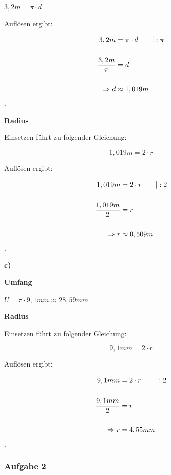 \documentclass[
  ngerman,
]{book}
\begin{document}
\(3,2m = \pi \cdot d \quad\)

Auflösen ergibt:

\[ \begin{align} 3,2m &= \pi \cdot d \quad\quad |: \pi \\
{}\\
{3,2m \over \pi} &= d \\
{}\\
\Rightarrow d & \approx 1,019 m
\end{align}\].

\textbf{Radius}

Einsetzen führt zu folgender Gleichung:

\[1,019 m =2 \cdot r\]

Auflösen ergibt:

\[ \begin{align} 1,019 m &=2 \cdot r \quad\quad |: 2 \\
{}\\
{1,019m \over 2} &= r \\
{}\\
\Rightarrow r & \approx 0,509 m
\end{align}\].

\textbf{c)}

\textbf{Umfang}

\(U = \pi \cdot 9,1mm \approx 28,59 mm\)

\textbf{Radius}

Einsetzen führt zu folgender Gleichung:

\[9,1 mm =2 \cdot r\]

Auflösen ergibt:

\[ \begin{align} 9,1 mm &=2 \cdot r \quad\quad |: 2 \\
{}\\
{9,1mm \over 2} &= r \\
{}\\
\Rightarrow r & = 4,55mm
\end{align}\].

\hypertarget{section-28}{%
\subsubsection*{}\label{section-28}}

\hypertarget{aufgabe-2-5}{%
\subsubsection*{Aufgabe 2}\label{aufgabe-2-5}}
\end{document}
